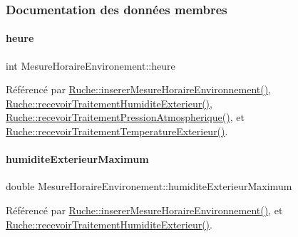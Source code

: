 \subsubsection{Documentation des données membres}
\mbox{\label{struct_mesure_horaire_environement_a83295c95940d9edae2d082a94f49e1c9}} 
\paragraph{\texorpdfstring{heure}{heure}}
{\footnotesize\ttfamily int Mesure\+Horaire\+Environement\+::heure}



Référencé par \hyperlink{class_ruche_ac52e79446c5629645e02e27d2a01e56c}{Ruche\+::inserer\+Mesure\+Horaire\+Environnement()}, \hyperlink{class_ruche_a59e89246b484d7b63851c0ebd20af6c5}{Ruche\+::recevoir\+Traitement\+Humidite\+Exterieur()}, \hyperlink{class_ruche_aa42daeffa023c83fde40072601e1fa39}{Ruche\+::recevoir\+Traitement\+Pression\+Atmospherique()}, et \hyperlink{class_ruche_a8482dda95a8a7888d5a60ea6f7d8729e}{Ruche\+::recevoir\+Traitement\+Temperature\+Exterieur()}.

\mbox{\label{struct_mesure_horaire_environement_abb2c00c4262837d9e1122573283d86ec}} 
\paragraph{\texorpdfstring{humidite\+Exterieur\+Maximum}{humiditeExterieurMaximum}}
{\footnotesize\ttfamily double Mesure\+Horaire\+Environement\+::humidite\+Exterieur\+Maximum}



Référencé par \hyperlink{class_ruche_ac52e79446c5629645e02e27d2a01e56c}{Ruche\+::inserer\+Mesure\+Horaire\+Environnement()}, et \hyperlink{class_ruche_a59e89246b484d7b63851c0ebd20af6c5}{Ruche\+::recevoir\+Traitement\+Humidite\+Exterieur()}.

\mbox{\label{struct_mesure_horaire_environement_a1621bd692dc352708d1931a48df9a596}} 
